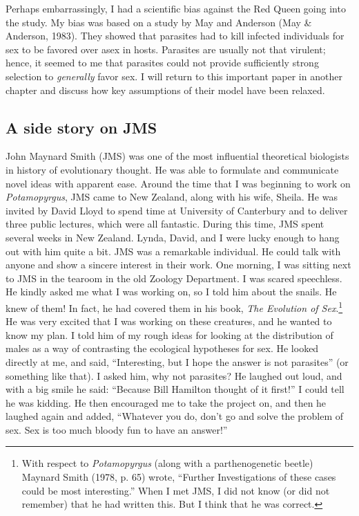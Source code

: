 \documentclass[
  letterpaper,
]{book}
\begin{document}
Perhaps embarrassingly, I had a scientific bias against the Red Queen
going into the study. My bias was based on a study by May and Anderson
(May \& Anderson, 1983). They showed that parasites had to kill infected
individuals for sex to be favored over asex in hosts. Parasites are
usually not that virulent; hence, it seemed to me that parasites could
not provide sufficiently strong selection to \emph{generally} favor sex.
I will return to this important paper in another chapter and discuss how
key assumptions of their model have been relaxed.

\hypertarget{a-side-story-on-jms}{%
\subsection{A side story on JMS}\label{a-side-story-on-jms}}

John Maynard Smith (JMS) was one of the most influential theoretical
biologists in history of evolutionary thought. He was able to formulate
and communicate novel ideas with apparent ease. Around the time that I
was beginning to work on \emph{Potamopyrgus}, JMS came to New Zealand,
along with his wife, Sheila. He was invited by David Lloyd to spend time
at University of Canterbury and to deliver three public lectures, which
were all fantastic. During this time, JMS spent several weeks in New
Zealand. Lynda, David, and I were lucky enough to hang out with him
quite a bit. JMS was a remarkable individual. He could talk with anyone
and show a sincere interest in their work. One morning, I was sitting
next to JMS in the tearoom in the old Zoology Department. I was scared
speechless. He kindly asked me what I was working on, so I told him
about the snails. He knew of them! In fact, he had covered them in his
book, \emph{The Evolution of Sex}.\footnote{With respect to
  \emph{Potamopyrgus} (along with a parthenogenetic beetle) Maynard
  Smith (1978, p. 65) wrote, ``Further Investigations of these cases
  could be most interesting.'' When I met JMS, I did not know (or did
  not remember) that he had written this. But I think that he was
  correct.} He was very excited that I was working on these creatures,
and he wanted to know my plan. I told him of my rough ideas for looking
at the distribution of males as a way of contrasting the ecological
hypotheses for sex. He looked directly at me, and said, ``Interesting,
but I hope the answer is not parasites'' (or something like that). I
asked him, why not parasites? He laughed out loud, and with a big smile
he said: ``Because Bill Hamilton thought of it first!'' I could tell he
was kidding. He then encouraged me to take the project on, and then he
laughed again and added, ``Whatever you do, don't go and solve the
problem of sex. Sex is too much bloody fun to have an answer!''
\end{document}
